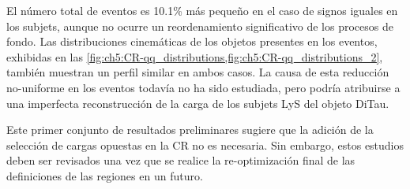 El número total de eventos es 10.1\% más pequeño en el caso de signos iguales en los subjets, aunque no ocurre un reordenamiento significativo de los procesos de fondo. Las distribuciones cinemáticas de los objetos presentes en los eventos, exhibidas en las \cref{fig:ch5:CR-qq_distributions,fig:ch5:CR-qq_distributions_2}, también muestran un perfil similar en ambos casos. La causa de esta reducción no-uniforme en los eventos todavía no ha sido estudiada, pero podría atribuirse a una imperfecta reconstrucción de la carga de los subjets LyS del objeto DiTau.

Este primer conjunto de resultados preliminares sugiere que la adición de la selección de cargas opuestas en la CR no es necesaria. Sin embargo, estos estudios deben ser revisados una vez que se realice la re-optimización final de las definiciones de las regiones en un futuro.


